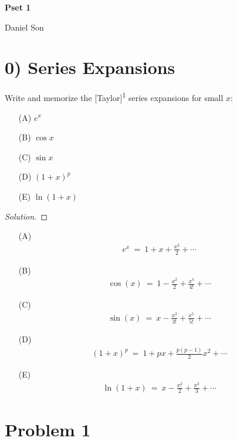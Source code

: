 \documentclass{article}
\numberwithin{equation}{section}
\begin{document}
\begin{center}
    \Large
    \textbf{Pset 1}

    \large
    Daniel Son
\end{center}

\section*{0) Series Expansions}

Write and memorize the [Taylor]\textsuperscript{1} series expansions for small $x$:

\begin{itemize}
    \item[(A)] $e^x$
    \item[(B)] $\cos x$
    \item[(C)] $\sin x$
    \item[(D)] $(1 + x)^p$
    \item[(E)] $\ln (1 + x)$
\end{itemize}

\begin{proof}[Solution]
    
\end{proof}
\begin{itemize}
    \item[(A)] \begin{eqnarray}
        e^x  \ = \ 1 + x + \frac {x^2} 2 + \cdots
    \end{eqnarray}
    \item[(B)] \begin{eqnarray}
        \cos(x) \ = \ 1 - \frac {x^2} 2 + \frac {x^4} {4!} + \cdots 
    \end{eqnarray}
    \item[(C)] \begin{eqnarray}
        \sin(x) \ = \ x - \frac {x^3} {3!} + \frac {x^5}{5!} + \cdots
    \end{eqnarray}
    \item[(D)] \begin{eqnarray}
        (1 + x)^p \ = \ 1 + px + \frac {p(p - 1)} 2 x^2 + \cdots
    \end{eqnarray}
    \item[(E)] \begin{eqnarray}
        \ln(1 + x) \ = \ x - \frac {x^2}  2 + \frac {x^3} {3} + \cdots
    \end{eqnarray}
\end{itemize}

\section{Problem 1}
\end{document}
